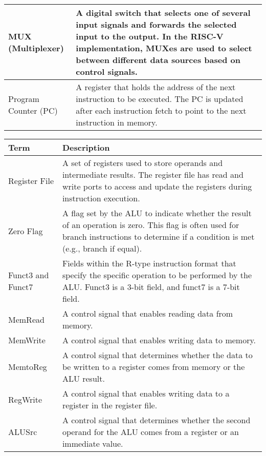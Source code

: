 \begin{table}[H]
\begin{tabularx}{\textwidth}{|p{3cm}|X|}
        \hline
        MUX (Multiplexer) & A digital switch that selects one of several input signals and forwards the selected input to the output. In the RISC-V implementation, MUXes are used to select between different data sources based on control signals. \\
        \hline
        Program Counter (PC) & A register that holds the address of the next instruction to be executed. The PC is updated after each instruction fetch to point to the next instruction in memory. \\
      
        \hline
    \end{tabularx}
\end{table}

\newpage

\begin{table}[H]
    \centering
    \begin{tabularx}{\textwidth}{|p{3cm}|X|}
        \hline
        \textbf{Term} & \textbf{Description} \\
        \hline\hline
        Register File & A set of registers used to store operands and intermediate results. The register file has read and write ports to access and update the registers during instruction execution. \\
        \hline
        Zero Flag & A flag set by the ALU to indicate whether the result of an operation is zero. This flag is often used for branch instructions to determine if a condition is met (e.g., branch if equal). \\
        \hline
        Funct3 and Funct7 & Fields within the R-type instruction format that specify the specific operation to be performed by the ALU. Funct3 is a 3-bit field, and funct7 is a 7-bit field. \\
        \hline
        MemRead & A control signal that enables reading data from memory. \\
        \hline
        MemWrite & A control signal that enables writing data to memory. \\
        \hline
        MemtoReg & A control signal that determines whether the data to be written to a register comes from memory or the ALU result. \\
        \hline
        RegWrite & A control signal that enables writing data to a register in the register file. \\
        \hline
        ALUSrc & A control signal that determines whether the second operand for the ALU comes from a register or an immediate value. \\

\end{tabularx}
\end{table}
